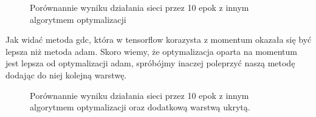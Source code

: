 \documentclass{article}
\begin{document}
\begin{figure}[h]
  \centering
  \caption{Porównannie wyniku działania sieci przez 10 epok z innym algorytmem optymalizacji}
\end{figure}

Jak widać metoda gdc, która w tensorflow korazysta z momentum okazała się być lepsza niż metoda adam.
Skoro wiemy, że optymalizacja oparta na momentum jest lepsza od optymalizacji adam, spróbójmy inaczej
poleprzyć naszą metodę dodając do niej kolejną warstwę.

\begin{figure}[H]
  \centering
  \caption{Porównannie wyniku działania sieci przez 10 epok
  z innym algorytmem optymalizacji oraz dodatkową warstwą ukrytą.}
\end{figure}
\end{document}
